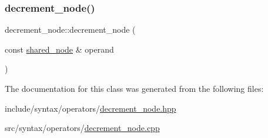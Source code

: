 \subsubsection{\texorpdfstring{decrement\+\_\+node()}{decrement\_node()}}
{\footnotesize\ttfamily decrement\+\_\+node\+::decrement\+\_\+node (\begin{DoxyParamCaption}\item[{const \hyperlink{namespacejawe_a3f307481d921b6cbb50cc8511fc2b544}{shared\+\_\+node} \&}]{operand }\end{DoxyParamCaption})}



The documentation for this class was generated from the following files\+:\begin{DoxyCompactItemize}
\item 
include/syntax/operators/\hyperlink{decrement__node_8hpp}{decrement\+\_\+node.\+hpp}\item 
src/syntax/operators/\hyperlink{decrement__node_8cpp}{decrement\+\_\+node.\+cpp}\end{DoxyCompactItemize}
